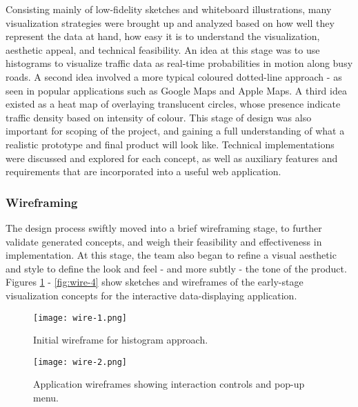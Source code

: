 \documentclass{article}
\begin{document}
Consisting mainly of low-fidelity sketches and whiteboard illustrations, many visualization strategies were brought up and analyzed based on how well they represent the data at hand, how easy it is to understand the visualization, aesthetic appeal, and technical feasibility.
An idea at this stage was to use histograms to visualize traffic data as real-time probabilities in motion along busy roads.
A second idea involved a more typical coloured dotted-line approach - as seen in popular applications such as Google Maps and Apple Maps.
A third idea existed as a heat map of overlaying translucent circles, whose presence indicate traffic density based on intensity of colour.
This stage of design was also important for scoping of the project, and gaining a full understanding of what a realistic prototype and final product will look like.
Technical implementations were discussed and explored for each concept, as well as auxiliary features and requirements that are incorporated into a useful web application.\\

\subsubsection{Wireframing}

The design process swiftly moved into a brief wireframing stage, to further validate generated concepts, and weigh their feasibility and effectiveness in implementation.
At this stage, the team also began to refine a visual aesthetic and style to define the look and feel - and more subtly - the tone of the product.
Figures \ref{fig:wire-1} - \ref{fig:wire-4} show sketches and wireframes of the early-stage visualization concepts for the interactive data-displaying application.\\

\begin{figure}[htbp!]
  \begin{centering}
    \texttt{[image: wire-1.png]}
    \caption{Initial wireframe for histogram approach.}
    \label{fig:wire-1}
  \end{centering}
\end{figure}

\begin{figure}[htbp!]
  \begin{centering}
    \texttt{[image: wire-2.png]}
    \caption{Application wireframes showing interaction controls and pop-up menu.}
    \label{fig:wire-2}
  \end{centering}
\end{figure}
\end{document}

